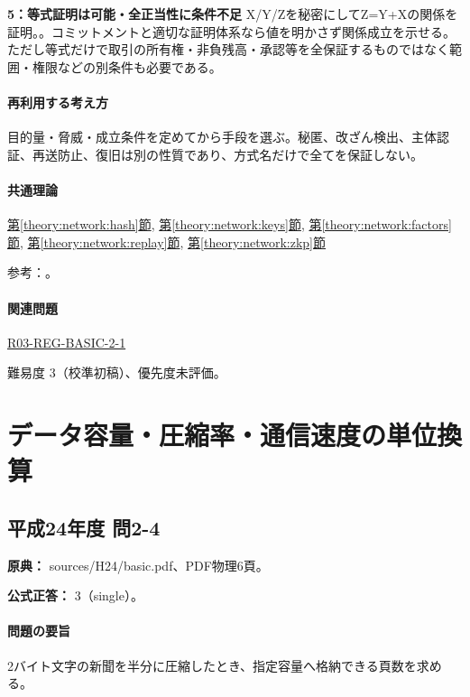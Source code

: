 \noindent\textbf{5：等式証明は可能・全正当性に条件不足} X/Y/Zを秘密にしてZ=\allowbreak{}Y+Xの関係を証明。。コミットメントと適切な証明体系なら値を明かさず関係成立を示せる。ただし等式だけで取引の所有権・非負残高・承認等を全保証するものではなく範囲・権限などの別条件も必要である。\par

\paragraph{再利用する考え方} 目的量・脅威・成立条件を定めてから手段を選ぶ。秘匿、改ざん検出、主体認証、再送防止、復旧は別の性質であり、方式名だけで全てを保証しない。

\paragraph{共通理論} \hyperref[theory:network:hash]{第\ref*{theory:network:hash}節}, \hyperref[theory:network:keys]{第\ref*{theory:network:keys}節}, \hyperref[theory:network:factors]{第\ref*{theory:network:factors}節}, \hyperref[theory:network:replay]{第\ref*{theory:network:replay}節}, \hyperref[theory:network:zkp]{第\ref*{theory:network:zkp}節}

\par 参考：\cite{net_hash,net_nist2017,net_signature,net_pq2024,net_pq2022,net_zkp2021}。

\paragraph{関連問題} \hyperref[q:r03-reg-basic-2-1]{R03-REG-BASIC-2-1}

\par 難易度 3（校準初稿）、優先度未評価。

\section{データ容量・圧縮率・通信速度の単位換算}

\subsection{平成24年度 問2-4}
\label{q:h24-reg-basic-2-4}

\noindent\textbf{原典：} sources/H24/basic.pdf、PDF物理6頁。

\textbf{公式正答：} 3（single）。

\paragraph{問題の要旨} 2バイト文字の新聞を半分に圧縮したとき、指定容量へ格納できる頁数を求める。

